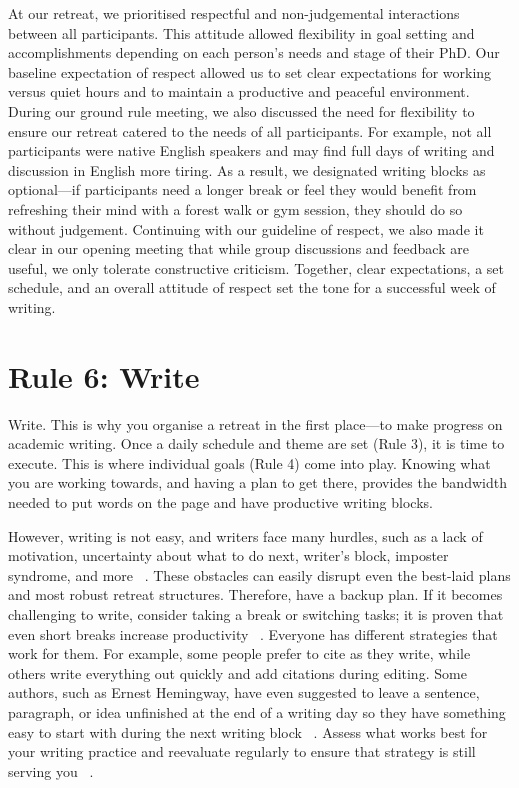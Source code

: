 \documentclass[10pt,letterpaper]{article}
\begin{document}
At our retreat, we prioritised respectful and non-judgemental interactions between all participants. This attitude allowed flexibility in goal setting and accomplishments depending on each person's needs and stage of their PhD. Our baseline expectation of respect allowed us to set clear expectations for working versus quiet hours and to maintain a productive and peaceful environment. During our ground rule meeting, we also discussed the need for flexibility to ensure our retreat catered to the needs of all participants. For example, not all participants were native English speakers and may find full days of writing and discussion in English more tiring. As a result, we designated writing blocks as optional---if participants need a longer break or feel they would benefit from refreshing their mind with a forest walk or gym session, they should do so without judgement. Continuing with our guideline of respect, we also made it clear in our opening meeting that while group discussions and feedback are useful, we only tolerate constructive criticism. Together, clear expectations, a set schedule, and an overall attitude of respect set the tone for a successful week of writing.

\section*{Rule 6: Write}

Write. This is why you organise a retreat in the first place---to make progress on academic writing. Once a daily schedule and theme are set (Rule 3), it is time to execute. This is where individual goals (Rule 4) come into play. Knowing what you are working towards, and having a plan to get there, provides the bandwidth needed to put words on the page and have productive writing blocks.

However, writing is not easy, and writers face many hurdles, such as a lack of motivation, uncertainty about what to do next, writer's block, imposter syndrome, and more ~\cite{boice1984, murray2013, wilson2019, grogan2021}. These obstacles can easily disrupt even the best-laid plans and most robust retreat structures. Therefore, have a backup plan. If it becomes challenging to write, consider taking a break or switching tasks; it is proven that even short breaks increase productivity ~\cite{carter2020, lyubykh2022}. Everyone has different strategies that work for them. For example, some people prefer to cite as they write, while others write everything out quickly and add citations during editing. Some authors, such as Ernest Hemingway, have even suggested to leave a sentence, paragraph, or idea unfinished at the end of a writing day so they have something easy to start with during the next writing block ~\cite{hemingway1935}. Assess what works best for your writing practice and reevaluate regularly to ensure that strategy is still serving you ~\cite{peterson2018, grogan2021}.
\end{document}
